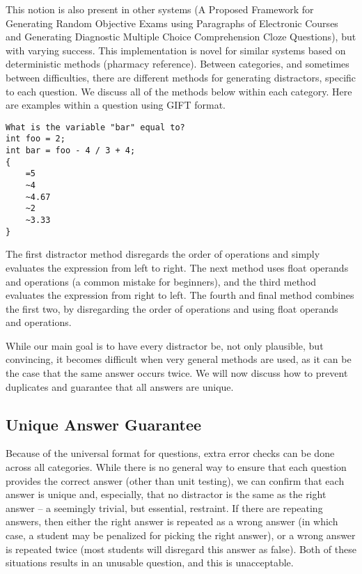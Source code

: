 \documentclass{article}
\begin{document}
This notion is also present in other systems (A Proposed Framework for Generating Random
Objective Exams using Paragraphs of Electronic
Courses and Generating Diagnostic Multiple Choice Comprehension Cloze Questions), but with varying success. This implementation is novel for similar systems based on deterministic methods (pharmacy reference). Between categories, and sometimes between difficulties, there are different methods for generating distractors, specific to each question. We discuss all of the methods below within each category. Here are examples within a question using GIFT format.

\begin{Verbatim}
What is the variable "bar" equal to?
int foo = 2;
int bar = foo - 4 / 3 + 4;
{
	=5
	~4
	~4.67
	~2
	~3.33
}
\end{Verbatim}

The first distractor method disregards the order of operations and simply evaluates the expression from left to right. The next method uses float operands and operations (a common mistake for beginners), and the third method evaluates the expression from right to left. The fourth and final method combines the first two, by disregarding the order of operations and using float operands and operations.

While our main goal is to have every distractor be, not only plausible, but convincing, it becomes difficult when very general methods are used, as it can be the case that the same answer occurs twice. We will now discuss how to prevent duplicates and guarantee that all answers are unique.

\subsection{Unique Answer Guarantee}

Because of the universal format for questions, extra error checks can be done across all categories. While there is no general way
to ensure that each question provides the correct answer (other than unit testing), we can confirm that each answer is unique and, especially, that no distractor is the same as the right answer -- a seemingly trivial, but essential, restraint. If there are repeating answers, then either the right answer is repeated as a wrong answer (in which case, a student may be penalized for picking the right answer), or a wrong answer is repeated twice (most students will disregard this answer as false). Both of these situations results in an unusable question, and this is unacceptable. 
\end{document}

